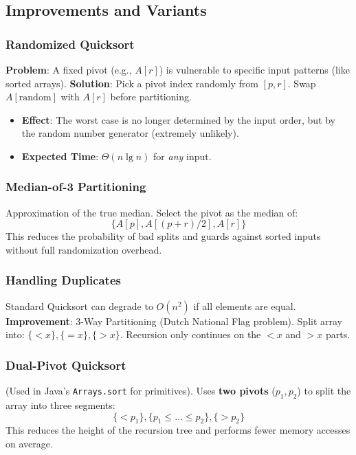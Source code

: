 \documentclass[12pt]{article}
\theoremstyle{blueplain}
\theoremstyle{bluedef}
\theoremstyle{blueremark}
\begin{document}
\subsection{Improvements and Variants}

\subsubsection{Randomized Quicksort}
\textbf{Problem}: A fixed pivot (e.g., $A[r]$) is vulnerable to specific input patterns (like sorted arrays).
\textbf{Solution}: Pick a pivot index randomly from $[p, r]$. Swap $A[\text{random}]$ with $A[r]$ before partitioning.
\begin{itemize}
    \item \textbf{Effect}: The worst case is no longer determined by the input order, but by the random number generator (extremely unlikely).
    \item \textbf{Expected Time}: $\Theta(n \lg n)$ for \textit{any} input.
\end{itemize}

\subsubsection{Median-of-3 Partitioning}
Approximation of the true median. Select the pivot as the median of:
\[ \{ A[p], A[(p+r)/2], A[r] \} \]
This reduces the probability of bad splits and guards against sorted inputs without full randomization overhead.

\subsubsection{Handling Duplicates}
Standard Quicksort can degrade to $O(n^2)$ if all elements are equal.
\textbf{Improvement}: 3-Way Partitioning (Dutch National Flag problem).
Split array into: $\{ < x \}, \{ = x \}, \{ > x \}$.
Recursion only continues on the $< x$ and $> x$ parts.

\subsubsection{Dual-Pivot Quicksort}
(Used in Java's \texttt{Arrays.sort} for primitives).
Uses \textbf{two pivots} ($p_1, p_2$) to split the array into three segments:
\[ \{ < p_1 \}, \{ p_1 \le \dots \le p_2 \}, \{ > p_2 \} \]
This reduces the height of the recursion tree and performs fewer memory accesses on average.

\clearpage
\end{document}
